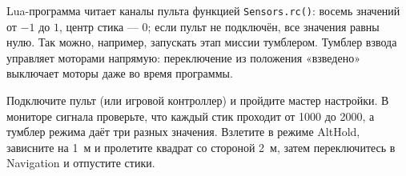 \begin{infobox}
Lua-программа читает каналы пульта функцией \verb|Sensors.rc()|: восемь значений от $-1$ до $1$, центр стика --- 0; если пульт не подключён, все значения равны нулю. Так можно, например, запускать этап миссии тумблером. Тумблер взвода управляет моторами напрямую: переключение из положения «взведено» выключает моторы даже во время программы.
\end{infobox}

\begin{taskbox}
Подключите пульт (или игровой контроллер) и пройдите мастер настройки. В мониторе сигнала проверьте, что каждый стик проходит от 1000 до 2000, а тумблер режима даёт три разных значения. Взлетите в режиме AltHold, зависните на 1~м и пролетите квадрат со стороной 2~м, затем переключитесь в Navigation и отпустите стики.
\end{taskbox}
